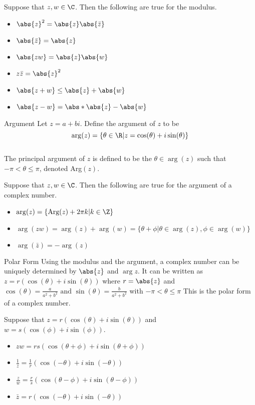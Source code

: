 \begin{prp}{}{} Suppose that $z,w\in\C$. Then the following are true for the modulus. 
\begin{itemize}
\item $\abs{z}^2=\abs{z}\abs{\bar{z}}$
\item $\abs{\bar{z}}=\abs{z}$
\item $\abs{zw}=\abs{z}\abs{w}$
\item $z\bar{z}=\abs{z}^2$
\item $\abs{z+w}\leq\abs{z}+\abs{w}$
\item $\abs{z-w}=\abs*{\abs{z}-\abs{w}}$
\end{itemize}
\end{prp}

\begin{defn}{Argument}{} Let $z=a+bi$. Define the argument of $z$ to be $$\arg(z)=\{\theta\in\R|z=\cos(\theta)+i\sin(\theta)\}$$~\\
The principal argument of $z$ is defined to be the $\theta\in\arg(z)$ such that $-\pi<\theta\leq\pi$, denoted Arg$(z)$. 
\end{defn}

\begin{prp}{}{} Suppose that $z,w\in\C$. Then the following are true for the argument of a complex number. 
\begin{itemize}
\item $\arg(z)=\{\text{Arg}(z)+2\pi k|k\in\Z\}$
\item $\arg{(zw)}=\arg{(z)}+\arg{(w)}=\{\theta+\phi|\theta\in\arg(z), \phi\in\arg(w)\}$
\item $\arg{(\bar{z})}=-\arg{(z)}$
\end{itemize}
\end{prp}

\begin{defn}{Polar Form}{} Using the modulus and the argument, a complex number can be uniquely determined by $\abs{z}$ and $\arg{z}$. It can be written as $z=r(\cos{(\theta)}+i\sin{(\theta)})$ where $r=\abs{z}$ and $\cos{(\theta)}=\frac{a}{a^2+b^2}\text{  and  }\sin{(\theta)}=\frac{b}{a^2+b^2}$ with $-\pi<\theta\leq\pi$ This is the polar form of a complex number. 
\end{defn}

\begin{prp}{}{} Suppose that $z=r(\cos{(\theta)}+i\sin{(\theta)})$ and $w=s(\cos{(\phi)}+i\sin{(\phi)})$. 
\begin{itemize}
\item $zw=rs(\cos{(\theta+\phi)}+i\sin{(\theta+\phi)})$
\item $\frac{1}{z}=\frac{1}{r}(\cos{(-\theta)}+i\sin{(-\theta)})$
\item $\frac{z}{w}=\frac{r}{s}(\cos{(\theta-\phi)}+i\sin{(\theta-\phi)})$
\item $\bar{z}=r(\cos{(-\theta)}+i\sin{(-\theta)})$
\end{itemize}
\end{prp}

